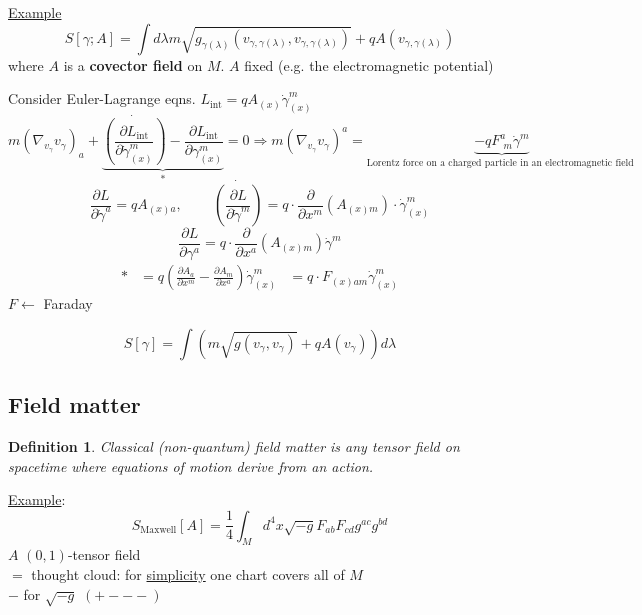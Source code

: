 \documentclass[10pt]{amsart}
\newtheorem{definition}{Definition}
\begin{document}
\begin{multicols*}{2}
\begin{enumerate}
		\underline{Example}
		\[
		S[\gamma;A] = \int d\lambda m \sqrt{ g_{\gamma(\lambda)}(v_{\gamma, \gamma(\lambda)}, v_{\gamma,\gamma(\lambda)} ) } + qA(v_{\gamma,\gamma(\lambda)})
		\]
		where $A$ is a \textbf{covector field} on $M$. $A$ fixed
		(e.g. the electromagnetic potential)
	\end{enumerate}
	
	Consider Euler-Lagrange eqns. $L_{\text{int}} = q A_{(x)} \dot{\gamma}^m_{(x)}$
	\[
	m (\nabla_{v_{\gamma}} v_{\gamma})_a + \underbrace{ \dot{ \left( \frac{ \partial L_{\text{int}} }{ \partial \dot{\gamma}^m_{(x)} } \right) }- \frac{ \partial L_{\text{int}} }{ \partial \gamma^m_{(x)} } }_{*} = 0  \Longrightarrow \boxed{ m (\nabla_{v_{\gamma} } v_{\gamma})^a = \underbrace{ -q F^a_{ \, \, m } \dot{\gamma}^m }_{\text{Lorentz force on a charged particle in an electromagnetic field } } }
	\]
	\[
	\frac{ \partial L}{ \partial \dot{\gamma}^a} = qA_{(x)a}, \quad \quad \, \dot{ \left( \frac{ \partial L}{ \partial \dot{\gamma}^m} \right) } = q \cdot \frac{ \partial }{ \partial x^m} (A_{(x)m} ) \cdot \dot{\gamma}^m_{(x)}
	\]
	\[
	\frac{ \partial L}{ \partial \gamma^a} = q \cdot \frac{ \partial }{ \partial x^a} (A_{(x)m} ) \dot{\gamma}^m
	\]
	\[
	\begin{aligned}
	* & = q\left( \frac{ \partial A_a}{ \partial x^m} - \frac{ \partial A_m}{ \partial x^a} \right) \dot{\gamma}^m_{(x)}
	& = q \cdot F_{(x)am} \dot{\gamma}^m_{(x)}
	\end{aligned}
	\]
	$F \leftarrow $ Faraday
	
	\[
	S[\gamma] = \int(m\sqrt{g(v_{\gamma},v_{\gamma} ) } + q A(v_{\gamma}) ) d\lambda
	\]
	
	\subsection{Field matter}
	
	\begin{definition}
		Classical (non-quantum) field matter is any tensor field on spacetime where equations of motion derive from an action.
	\end{definition}
	
	\underline{Example}: 
	\[
	S_{\text{Maxwell}}[A] = \frac{1}{4}\int_M d^4x \sqrt{-g}F_{ab}F_{cd}g^{ac}g^{bd}
	\]
	$A$ $(0,1)$-tensor field \\
	$=$ thought cloud: for \underline{simplicity} one chart covers all of $M$ \\
	$-$ for $\sqrt{-g}$ $(+---)$ \\
	

\end{multicols*}
\end{document}
